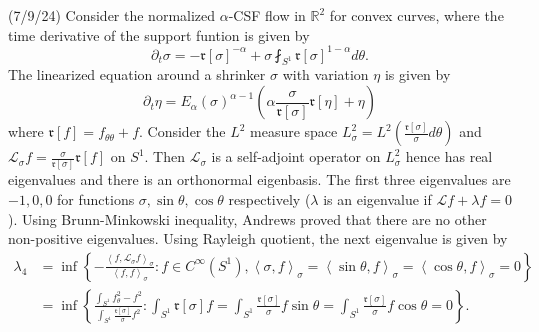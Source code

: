 \documentclass[12pt,a4paper]{article}
\newcommand{\R}{\mathbb{R}}
\begin{document}
(7/9/24) Consider the normalized $ \alpha $-CSF flow in $ \R^{2} $ for convex curves, where the time derivative of the support funtion is given by 
\[ \partial_{t}\sigma = - \mathfrak{r}[\sigma]^{-\alpha}+ \sigma\fint_{S^{1}} \mathfrak{r}[\sigma]^{1-\alpha}d \theta.\]
The linearized equation around a shrinker $ \sigma $ with variation $ \eta $ is given by 
\[ \partial_{t} \eta  = E_{\alpha}(\sigma)^{\alpha-1}\left(\alpha \frac{\sigma}{ \mathfrak{r}[\sigma]} \mathfrak{r}[\eta]+ \eta\right)\]
where $ \mathfrak{r}[f] = f_{\theta \theta}+f $. Consider the $ L^{2} $ measure space $ L^{2}_{\sigma} = L^{2}( \frac{\mathfrak{r}[\sigma]}{\sigma}d \theta ) $ and $ \mathcal{L}_{\sigma}f = \frac{\sigma}{ \mathfrak{r}[\sigma]} \mathfrak{r}[f] $ on $ S^{1} $. Then $ \mathcal{L}_{\sigma} $ is a self-adjoint operator on $ L^{2}_{\sigma} $ hence has real eigenvalues and there is an orthonormal eigenbasis. The first three eigenvalues are $ -1, 0, 0 $ for functions $ \sigma, \sin \theta, \cos \theta $ respectively ($ \lambda $ is an eigenvalue if $ \mathcal{L}f+ \lambda f = 0 $). Using Brunn-Minkowski inequality, Andrews proved that there are no other non-positive eigenvalues. Using Rayleigh quotient, the next eigenvalue is given by 
\begin{align*}
   \lambda_{4} &  = \inf \left\{ - \frac{\left< f, \mathcal{L}_{\sigma}f \right>_{\sigma}}{ \left< f,f \right>_{\sigma}} : f \in C^{\infty}(S^{1}), \left< \sigma, f \right>_{\sigma} = \left< \sin \theta, f \right>_{\sigma} = \left< \cos \theta, f \right>_{\sigma} = 0\right\} \\
   & = \inf \left\{ \frac{\int_{S^{1}}f_{\theta}^{2}-f^{2}}{\int_{S^{1}} \frac{ \mathfrak{r}[\sigma]}{\sigma}f^{2}} : \int_{S^{1}} \mathfrak{r}[\sigma]f = \int_{S^{1}} \frac{ \mathfrak{r}[\sigma]}{\sigma}f \sin \theta = \int_{S^{1}} \frac{ \mathfrak{r}[\sigma]}{\sigma}f \cos \theta = 0 \right\}.
\end{align*}
\end{document}
